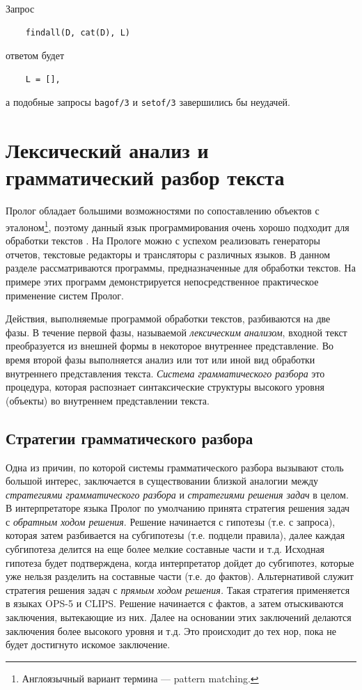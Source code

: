 \documentclass[12pt, openany, twoside]{book} %
\begin{document}
\noindent Запрос
{\tt\begin{verbatim}
    findall(D, cat(D), L)
\end{verbatim}}

\noindent ответом будет
{\tt\begin{verbatim}
    L = [],
\end{verbatim}}
\noindent а подобные запросы {\tt bagof/3} и {\tt setof/3} завершились бы неудачей.

\section{Лексический анализ и грамматический разбор текста}

Пролог обладает большими возможностями по сопоставлению объектов с эталоном\footnote{Англоязычный вариант термина --- pattern matching.}, поэтому данный язык программирования очень хорошо подходит для обработки текстов \cite{Malpas}. На Прологе можно с успехом реализовать генераторы отчетов, текстовые редакторы и трансляторы с различных языков. В данном разделе рассматриваются программы, предназначенные для обработки текстов. На примере этих программ демонстрируется непосредственное практическое применение систем Пролог.

Действия, выполняемые программой обработки текстов, разбиваются на две фазы. В течение первой фазы, называемой \emph{лексическим анализом}, входной текст преобразуется из внешней формы в некоторое внутреннее представление. Во время второй фазы выполняется анализ или тот или иной вид обработки внутреннего представления текста. \emph{Система грамматического разбора} это процедура, которая распознает синтаксические структуры высокого уровня (объекты) во внутреннем представлении текста.

\subsection{Стратегии грамматического разбора}

Одна из причин, по которой системы грамматического разбора вызывают столь большой интерес, заключается в существовании близкой аналогии между \emph{стратегиями грамматического разбора} и \emph{стратегиями решения задач} в целом. В интерпретаторе языка Пролог по умолчанию принята стратегия решения задач с \emph{обратным ходом решения}. Решение начинается с гипотезы (т.е. с запроса), которая затем разбивается на субгипотезы (т.е. подцели правила), далее каждая субгипотеза делится на еще более мелкие составные части и т.д. Исходная гипотеза будет подтверждена, когда интерпретатор дойдет до субгипотез, которые уже нельзя разделить на составные части (т.е. до фактов). Альтернативой служит стратегия решения задач с \emph{прямым ходом решения.} Такая стратегия применяется в языках OPS-5 и CLIPS. Решение начинается с фактов, а затем отыскиваются заключения, вытекающие из них. Далее на основании этих заключений делаются заключения более высокого уровня и т.д. Это происходит до тех нор, пока не будет достигнуто искомое заключение.
\end{document}
